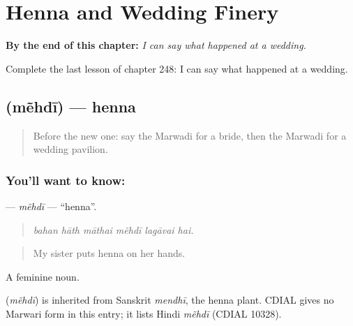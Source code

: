 
\chapter{Henna and Wedding Finery}
\label{ch:mw-henna-and-wedding-finery}

\begin{chapteropening}
\textbf{By the end of this chapter:} \emph{I can say what happened at a wedding.}

Complete the last lesson of chapter 248: I can say what happened at a wedding.
\end{chapteropening}

\section[\texorpdfstring{\mw{मेंहदी} (mẽhdī)}{मेंहदी (mẽhdī)}]{ (mẽhdī) — henna}

\label{lesson:MW-C248-mehdi}



\begin{quote}
Before the new one: say the Marwadi for a bride, then the Marwadi for a wedding pavilion.
\end{quote}

\subsection*{You'll want to know: }
\textbf{} — \emph{mẽhdī} — \textquotedblleft{}henna\textquotedblright{}.

\begin{quote}
     
\end{quote}

\begin{quote}
\emph{bahan hāth māthai mẽhdī lagāvai hai.}
\end{quote}

\begin{quote}
My sister puts henna on her hands.
\end{quote}

A feminine noun.

\begin{cousinweb}
\textbf{} (\emph{mẽhdī}) is inherited from Sanskrit \emph{mendhī}, the henna plant. CDIAL gives no Marwari form in this entry; it lists Hindi \emph{mẽhdī} (CDIAL 10328).
\end{cousinweb}

